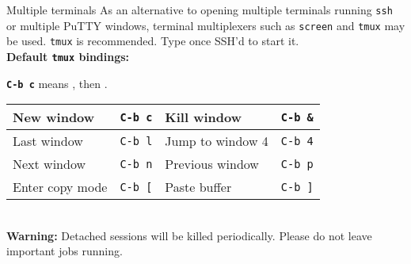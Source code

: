 \begin{block}{Multiple terminals}
  As an alternative to opening multiple terminals running \texttt{ssh} or multiple PuTTY windows, terminal multiplexers such as \texttt{screen} and \texttt{tmux} may be used. \texttt{tmux} is recommended. Type  once SSH'd to start it. \\
  \textbf{Default \texttt{tmux} bindings:} \\
  {\newcommand{\key}[1]{\texttt{C-b #1}}
    \textbf{\key{c}} means , then .
    \begin{tabu} to 0.9\linewidth { X[2] X X[2] X }
      \hline
      New window & \key{c} & Kill window & \key{\&} \\ \hline
      Last window & \key{l} & Jump to window 4 & \key{4} \\ \hline
      Next window & \key{n} & Previous window & \key{p} \\ \hline
      Enter copy mode & \key{[} & Paste buffer & \key{]} \\ \hline
    \end{tabu} \\[0.5em]
    \textbf{Warning:} Detached sessions will be killed periodically. Please do not leave important jobs running.
  }
\end{block}
